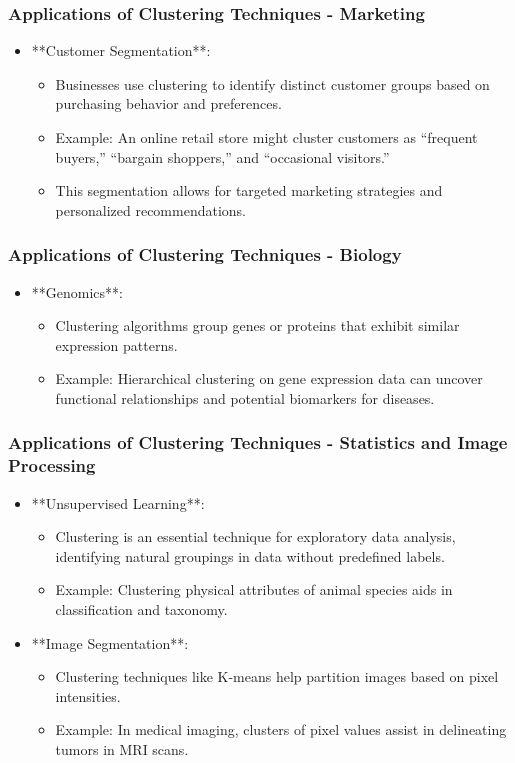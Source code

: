 \documentclass[aspectratio=169]{beamer}
\begin{document}
\begin{frame}[fragile]
    \frametitle{Applications of Clustering Techniques - Marketing}
    \begin{itemize}
        \item **Customer Segmentation**:
        \begin{itemize}
            \item Businesses use clustering to identify distinct customer groups based on purchasing behavior and preferences.
            \item Example: An online retail store might cluster customers as “frequent buyers,” “bargain shoppers,” and “occasional visitors.”
            \item This segmentation allows for targeted marketing strategies and personalized recommendations.
        \end{itemize}
    \end{itemize}
\end{frame}

\begin{frame}[fragile]
    \frametitle{Applications of Clustering Techniques - Biology}
    \begin{itemize}
        \item **Genomics**:
        \begin{itemize}
            \item Clustering algorithms group genes or proteins that exhibit similar expression patterns.
            \item Example: Hierarchical clustering on gene expression data can uncover functional relationships and potential biomarkers for diseases.
        \end{itemize}
    \end{itemize}
\end{frame}

\begin{frame}[fragile]
    \frametitle{Applications of Clustering Techniques - Statistics and Image Processing}
    \begin{itemize}
        \item **Unsupervised Learning**:
        \begin{itemize}
            \item Clustering is an essential technique for exploratory data analysis, identifying natural groupings in data without predefined labels.
            \item Example: Clustering physical attributes of animal species aids in classification and taxonomy.
        \end{itemize}

        \item **Image Segmentation**:
        \begin{itemize}
            \item Clustering techniques like K-means help partition images based on pixel intensities.
            \item Example: In medical imaging, clusters of pixel values assist in delineating tumors in MRI scans.
        \end{itemize}
    \end{itemize}
\end{frame}
\end{document}
